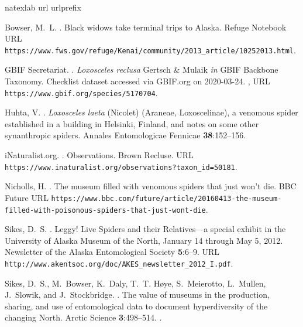 \begin{thebibliography}{9}
\expandafter\ifx\csname natexlab\endcsname\relax\def\natexlab#1{#1}\fi
\expandafter\ifx\csname url\endcsname\relax
  \def\url#1{{\tt #1}}\fi
\expandafter\ifx\csname urlprefix\endcsname\relax\def\urlprefix{{\small URL}
  }\fi

Bowser, M.~L.
.
\newblock Black widows take terminal trips to Alaska.
\newblock Refuge Notebook
  \urlprefix\url{https://www.fws.gov/refuge/Kenai/community/2013_article/10252013.html}.

{GBIF Secretariat}.
.
\newblock \textit{Loxosceles reclusa} Gertsch \& Mulaik \textit{in} GBIF
  Backbone Taxonomy. Checklist dataset accessed via GBIF.org on 2020-03-24.
\newblock {},
  \urlprefix\url{https://www.gbif.org/species/5170704}.

Huhta, V.
.
\newblock \textit{Loxosceles laeta} (Nicolet) (Araneae, Loxoscelinae), a
  venomous spider established in a building in Helsinki, Finland, and notes on
  some other synanthropic spiders.
\newblock Annales Entomologicae Fennicae {\bfseries 38}:152--156.

iNaturalist.org.
.
\newblock Observations. Brown Recluse.
\newblock
  \urlprefix\url{https://www.inaturalist.org/observations?taxon_id=50181}.

Nicholls, H.
.
\newblock The museum filled with venomous spiders that just won't die.
\newblock BBC Future
  \urlprefix\url{https://www.bbc.com/future/article/20160413-the-museum-filled-with-poisonous-spiders-that-just-wont-die}.

Sikes, D.~S.
.
\newblock Leggy! Live Spiders and their Relatives—a special exhibit in the
  University of Alaska Museum of the North, January 14 through May 5, 2012.
\newblock Newsletter of the Alaska Entomological Society {\bfseries 5}:6--9.
\newblock
  \urlprefix\url{http://www.akentsoc.org/doc/AKES_newsletter_2012_I.pdf}.

Sikes, D.~S., M.~Bowser, K.~Daly, T.~T. Høye, S.~Meierotto, L.~Mullen,
  J.~Slowik, and J.~Stockbridge.
.
\newblock The value of museums in the production, sharing, and use of
  entomological data to document hyperdiversity of the changing North.
\newblock Arctic Science {\bfseries 3}:498--514.
\newblock {}.


\end{thebibliography}
